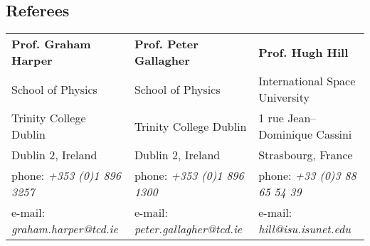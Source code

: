 \documentclass[margin,line]{resume}
\begin{document}
\begin{resume}

\vspace{0mm}
\section{\mysidestyle Referees} 

\begin{tabular}{@{}p{4.6cm}p{4.6cm}p{4.8cm}}
\textbf{Prof. Graham Harper}       &  \textbf{Prof. Peter Gallagher}   &  \textbf{Prof. Hugh Hill} \\
School of Physics                      &  School of Physics                   &  International Space University \\
Trinity College Dublin                 &  Trinity College Dublin                   &  1 rue Jean--Dominique Cassini \\
Dublin 2, Ireland				       &  Dublin 2, Ireland		         &  Strasbourg, France \\
phone: \textsl{+353 (0)1 896 3257}    &  phone: \textsl{+353 (0)1 896 1300} &  phone: \textsl{+33 (0)3 88 65 54 39} \\
e-mail: \textsl{graham.harper@tcd.ie}   &  e-mail: \textsl{peter.gallagher@tcd.ie}&  e-mail: \textsl{hill@isu.isunet.edu} \\
\end{tabular}




\end{resume}
\end{document}
